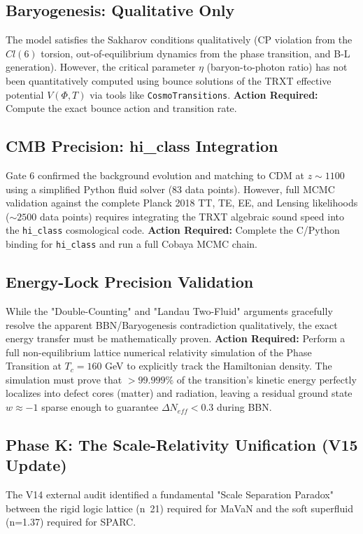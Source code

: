 \documentclass[a4paper,12pt]{article}
\begin{document}
\subsection{Baryogenesis: Qualitative Only}
The model satisfies the Sakharov conditions qualitatively (CP violation from the $Cl(6)$ torsion, out-of-equilibrium dynamics from the phase transition, and B-L generation). However, the critical parameter $\eta$ (baryon-to-photon ratio) has not been quantitatively computed using bounce solutions of the TRXT effective potential $V(\Phi, T)$ via tools like \texttt{CosmoTransitions}. \textbf{Action Required:} Compute the exact bounce action and transition rate.

\subsection{CMB Precision: hi\_class Integration}
Gate 6 confirmed the background evolution and matching to CDM at $z \sim 1100$ using a simplified Python fluid solver (83 data points). However, full MCMC validation against the complete Planck 2018 TT, TE, EE, and Lensing likelihoods ($\sim 2500$ data points) requires integrating the TRXT algebraic sound speed into the \texttt{hi\_class} cosmological code. \textbf{Action Required:} Complete the C/Python binding for \texttt{hi\_class} and run a full Cobaya MCMC chain.

\subsection{Energy-Lock Precision Validation}
While the "Double-Counting" and "Landau Two-Fluid" arguments gracefully resolve the apparent BBN/Baryogenesis contradiction qualitatively, the exact energy transfer must be mathematically proven. \textbf{Action Required:} Perform a full non-equilibrium lattice numerical relativity simulation of the Phase Transition at $T_c = 160$ GeV to explicitly track the Hamiltonian density. The simulation must prove that $> 99.999\%$ of the transition's kinetic energy perfectly localizes into defect cores (matter) and radiation, leaving a residual ground state $w \approx -1$ sparse enough to guarantee $\Delta N_{eff} < 0.3$ during BBN.

\subsection{Phase K: The Scale-Relativity Unification (V15 Update)}
The V14 external audit identified a fundamental "Scale Separation Paradox" between the rigid logic lattice (n~21) required for MaVaN and the soft superfluid (n=1.37) required for SPARC. 
\end{document}
